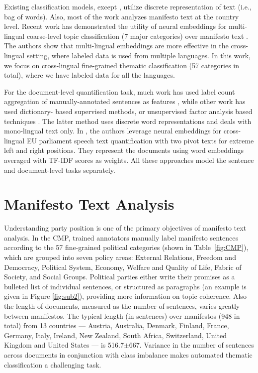 \documentclass[11pt,a4paper]{article}
\newcommand{\tabref}[2][]{Table#1~\ref{#2}\xspace}
\begin{document}
Existing classification models, except \cite{W17-2906}, utilize discrete representation of text (i.e., bag of words).  Also, most of the work analyzes manifesto text at the country level. Recent work has demonstrated the utility of neural embeddings for multi-lingual coarse-level topic classification (7 major categories) over manifesto text \cite{W17-2906}. The authors show that multi-lingual embeddings are more effective in the cross-lingual setting, where labeled data is used from multiple languages. In this work, we focus on cross-lingual fine-grained thematic classification (57 categories in total), where we have labeled data for all the languages.

For the document-level quantification task, much work has used label count aggregation of  manually-annotated sentences as features \cite{lowe2011scaling, benoit2014putting}, while other work has used dictionary- based supervised methods, or unsupervised factor analysis based techniques \cite{hjorth2015computers, 2017arXiv170704737B}. The latter method uses discrete word representations and deals with mono-lingual text only. In , the authors leverage neural embeddings for cross-lingual EU parliament speech text quantification with two pivot texts for extreme left and right positions. They represent the documents using word embeddings averaged with TF-IDF scores as weights. All these approaches model the sentence and document-level tasks separately.


\section{Manifesto Text Analysis}
Understanding party position is one of the primary objectives of manifesto text analysis. In the CMP, trained annotators manually label manifesto sentences according to the 57 fine-grained political categories (shown in \tabref{fig:CMP}), which are grouped into seven policy areas: External Relations, Freedom and Democracy, Political System, Economy, Welfare and Quality of Life, Fabric of Society, and Social Groups. Political parties either write their promises as a bulleted list of individual sentences, or structured as paragraphs (an example is given in Figure \ref{fig:sub2}), providing more information on topic coherence. Also the length of documents, measured as the number of sentences, varies greatly between manifestos. The typical length (in sentences) over manifestos (948 in total) from 13 countries --- Austria, Australia, Denmark, Finland, France, Germany, Italy, Ireland, New Zealand, South Africa, Switzerland, United Kingdom and United States --- is 516.7$\pm$667. Variance in the number of sentences across documents in conjunction with class imbalance makes automated thematic classification a challenging task.  
\end{document}
